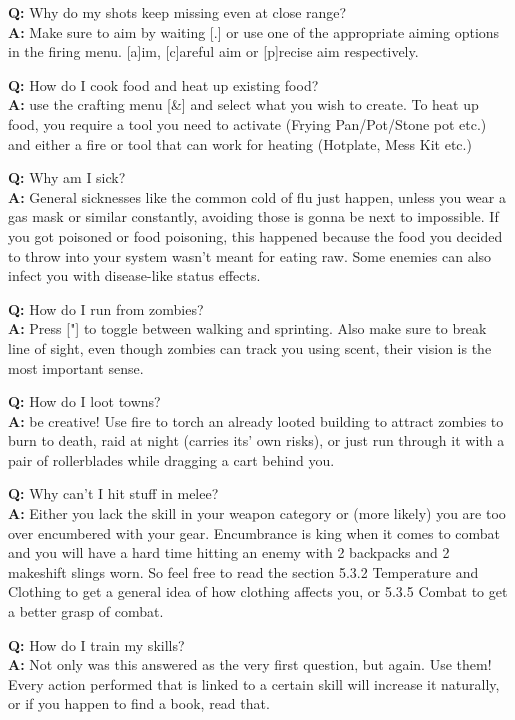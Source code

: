 \textbf{Q:} Why do my shots keep missing even at close range?\\
\textbf{A:} Make sure to aim by waiting [.] or use one of the appropriate aiming options in the firing menu. [a]im, [c]areful aim or [p]recise aim respectively.

\textbf{Q:} How do I cook food and heat up existing food?\\
\textbf{A:} use the crafting menu [\&] and select what you wish to create. To heat up food, you require a tool you need to activate (Frying Pan/Pot/Stone pot etc.) and either a fire or tool that can work for heating (Hotplate, Mess Kit etc.)

\textbf{Q:} Why am I sick?\\
\textbf{A:} General sicknesses like the common cold of flu just happen, unless you wear a gas mask or similar constantly, avoiding those is gonna be next to impossible. If you got poisoned or food poisoning, this happened because the food you decided to throw into your system wasn't meant for eating raw. Some enemies can also infect you with disease-like status effects.

\textbf{Q:} How do I run from zombies?\\
\textbf{A:} Press ["] to toggle between walking and sprinting. Also make sure to break line of sight, even though zombies can track you using scent, their vision is the most important sense.

\textbf{Q:} How do I loot towns?\\
\textbf{A:} be creative! Use fire to torch an already looted building to attract zombies to burn to death, raid at night (carries its' own risks), or just run through it with a pair of rollerblades while dragging a cart behind you.

\textbf{Q:} Why can't I hit stuff in melee?\\
\textbf{A:} Either you lack the skill in your weapon category or (more likely) you are too over encumbered with your gear. Encumbrance is king when it comes to combat and you will have a hard time hitting an enemy with 2 backpacks and 2 makeshift slings worn. So feel free to read the section 5.3.2 Temperature and Clothing to get a general idea of how clothing affects you, or 5.3.5 Combat to get a better grasp of combat.

\textbf{Q:} How do I train my skills?\\
\textbf{A:} Not only was this answered as the very first question, but again. Use them! Every action performed that is linked to a certain skill will increase it naturally, or if you happen to find a book, read that.

